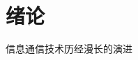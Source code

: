
\graphicspath{{figures/chapter1/}}
\chapter{绪论}
\label{chap-11}

信息通信技术历经漫长的演进\cite{tangwankai2021}
